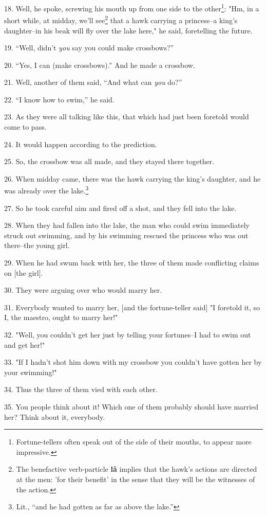 18. Well, he spoke, screwing his mouth up from one side to the other\footnote{Fortune-tellers often speak out of the side of their mouths, to appear more impressive.}: "Hm,
in a short while, at midday, we'll see\footnote{The benefactive verb-particle \textbf{lâ} implies that the hawk's actions are directed at the men: 'for their benefit' in the sense that they will be the witnesses of the action.} that a hawk carrying a princess--a
king's daughter--in his beak will fly over the lake here," he said, foretelling
the future.

19. ``Well, didn't \textit{you} say you could make crossbows?''

20. ``Yes, I can (make crossbows).'' And he made a crossbow.

21. Well, another of them said, ``And what can \textit{you} do?''

22. ``I know how to swim,'' he said.

23. As they were all talking like this, that which had just been foretold would
come to pass.

24. It would happen according to the prediction.

25. So, the crossbow was all made, and they stayed there together.

26. When midday came, there was the hawk carrying the king's daughter, and he was
already over the lake.\footnote{Lit., ``and he had gotten as far as above the lake.''}

27. So he took careful aim and fired off a shot, and they fell into the lake.

28. When they had fallen into the lake, the man who could swim immediately struck
out swimming, and by his swimming rescued the princess who was out there--the young
girl.

29. When he had swum back with her, the three of them made conflicting claims on
[the girl].

30. They were arguing over who would marry her.

31. Everybody wanted to marry her, [and the fortune-teller said] "I foretold
it, so I, the maestro, ought to marry her!"

32. "Well, you couldn't get her just by telling your fortunes--I had to
swim out and get her!"

33. "If I hadn't shot him down with my crossbow you couldn't have gotten
her by your swimming!"

34. Thus the three of them vied with each other.

35. You people think about it! Which one of them probably should have married her?
Think about it, everybody.

